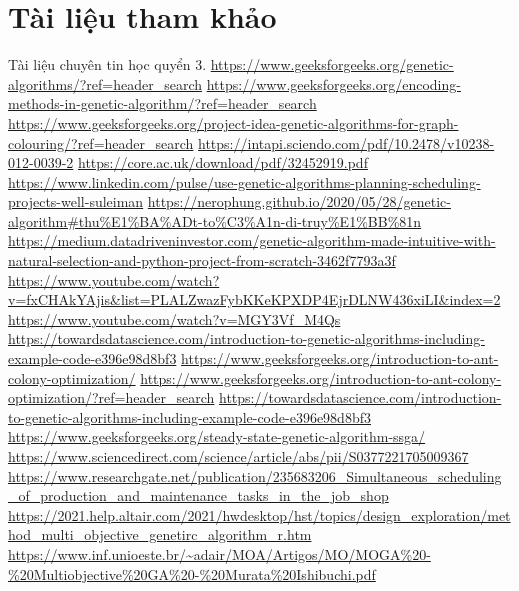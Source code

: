 \documentclass[14pt]{article}
\begin{document}
	\section{Tài liệu tham khảo}
	\begin{thebibliography}{99} %
		
		 Tài liệu chuyên tin học quyển 3.
		 \url{https://www.geeksforgeeks.org/genetic-algorithms/?ref=header_search}
		 \url{https://www.geeksforgeeks.org/encoding-methods-in-genetic-algorithm/?ref=header_search}
		 \url{https://www.geeksforgeeks.org/project-idea-genetic-algorithms-for-graph-colouring/?ref=header_search}
		 \url{https://intapi.sciendo.com/pdf/10.2478/v10238-012-0039-2}
		 \url{https://core.ac.uk/download/pdf/32452919.pdf}
		 \url{https://www.linkedin.com/pulse/use-genetic-algorithms-planning-scheduling-projects-well-suleiman}
		 \url{https://nerophung.github.io/2020/05/28/genetic-algorithm#thu%E1%BA%ADt-to%C3%A1n-di-truy%E1%BB%81n}
		 \url{https://medium.datadriveninvestor.com/genetic-algorithm-made-intuitive-with-natural-selection-and-python-project-from-scratch-3462f7793a3f}
		 \url{https://www.youtube.com/watch?v=fxCHAkYAjis&list=PLALZwazFybKKeKPXDP4EjrDLNW436xiLI&index=2}
		 \url{https://www.youtube.com/watch?v=MGY3Vf_M4Qs}
		 \url{https://towardsdatascience.com/introduction-to-genetic-algorithms-including-example-code-e396e98d8bf3}
		 \url{https://www.geeksforgeeks.org/introduction-to-ant-colony-optimization/}
		 \url{https://www.geeksforgeeks.org/introduction-to-ant-colony-optimization/?ref=header_search}
		 \url{https://towardsdatascience.com/introduction-to-genetic-algorithms-including-example-code-e396e98d8bf3}
		 \url{https://www.geeksforgeeks.org/steady-state-genetic-algorithm-ssga/}
		 \url{https://www.sciencedirect.com/science/article/abs/pii/S0377221705009367}
		 \url{https://www.researchgate.net/publication/235683206_Simultaneous_scheduling_of_production_and_maintenance_tasks_in_the_job_shop}
		 \url{https://2021.help.altair.com/2021/hwdesktop/hst/topics/design_exploration/method_multi_objective_genetirc_algorithm_r.htm}
		 \url{https://www.inf.unioeste.br/~adair/MOA/Artigos/MO/MOGA%20-%20Multiobjective%20GA%20-%20Murata%20Ishibuchi.pdf}

\end{thebibliography}
\end{document}
